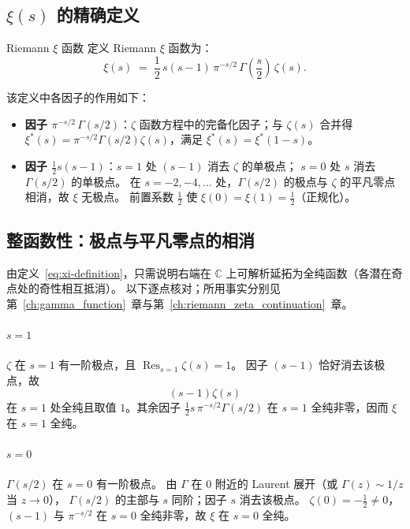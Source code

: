 \subsection{\texorpdfstring{$\xi(s)$}{xi(s)} 的精确定义}

\begin{definition}{\texorpdfstring{Riemann $\xi$ 函数}{Riemann xi 函数}}{}
定义 Riemann $\xi$ 函数为：
\begin{equation}
    \xi(s) \;=\; \frac{1}{2}\, s(s-1)\, \pi^{-s/2}\, \Gamma\!\left(\frac{s}{2}\right)\, \zeta(s).
    \label{eq:xi-definition}
\end{equation}
\end{definition}

该定义中各因子的作用如下：
\begin{itemize}
    \item \textbf{因子 $\pi^{-s/2}\,\Gamma(s/2)$}：$\zeta$ 函数方程中的完备化因子；与 $\zeta(s)$ 合并得
    $\xi^*(s)=\pi^{-s/2}\Gamma(s/2)\zeta(s)$，满足 $\xi^*(s)=\xi^*(1-s)$。
    \item \textbf{因子 $\frac{1}{2}s(s-1)$}：$s=1$ 处 $(s-1)$ 消去 $\zeta$ 的单极点；
    $s=0$ 处 $s$ 消去 $\Gamma(s/2)$ 的单极点。
    在 $s=-2,-4,\ldots$ 处，$\Gamma(s/2)$ 的极点与 $\zeta$ 的平凡零点相消，故 $\xi$ 无极点。
    前置系数 $\frac12$ 使 $\xi(0)=\xi(1)=\frac12$（正规化）。
\end{itemize}

\subsection{整函数性：极点与平凡零点的相消}
\label{sec:xi-entire-proof}

由定义~\eqref{eq:xi-definition}，只需说明右端在 $\mathbb{C}$ 上可解析延拓为全纯函数（各潜在奇点处的奇性相互抵消）。
以下逐点核对；所用事实分别见第~\ref{ch:gamma_function}~章与第~\ref{ch:riemann_zeta_continuation}~章。

\paragraph{$s=1$}
$\zeta$ 在 $s=1$ 有一阶极点，且 $\operatorname{Res}_{s=1}\zeta(s)=1$。
因子 $(s-1)$ 恰好消去该极点，故
\[
  (s-1)\zeta(s)
\]
在 $s=1$ 处全纯且取值 $1$。其余因子 $\frac12 s\,\pi^{-s/2}\Gamma(s/2)$ 在 $s=1$ 全纯非零，因而 $\xi$ 在 $s=1$ 全纯。

\paragraph{$s=0$}
$\Gamma(s/2)$ 在 $s=0$ 有一阶极点。
由 $\Gamma$ 在 $0$ 附近的 Laurent 展开（或 $\Gamma(z)\sim 1/z$ 当 $z\to 0$），
$\Gamma(s/2)$ 的主部与 $s$ 同阶；因子 $s$ 消去该极点。
$\zeta(0)=-\frac12\neq 0$，$(s-1)$ 与 $\pi^{-s/2}$ 在 $s=0$ 全纯非零，故 $\xi$ 在 $s=0$ 全纯。

